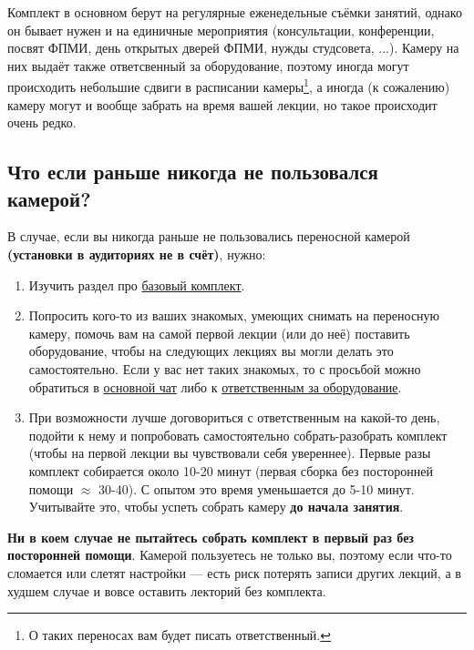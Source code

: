 Комплект в основном берут на регулярные еженедельные съёмки занятий, однако он бывает нужен и на единичные мероприятия (консультации, конференции, посвят ФПМИ, день открытых дверей ФПМИ, нужды студсовета, ...). Камеру на них выдаёт также ответсвенный за оборудование, поэтому иногда могут происходить небольшие сдвиги в расписании камеры\footnote{О таких переносах вам будет писать ответственный.}, а иногда (к сожалению) камеру могут и вообще забрать на время вашей лекции, но такое происходит очень редко.

\subsection{Что если раньше никогда не пользовался камерой?}

В случае, если вы никогда раньше не пользовались переносной камерой \textbf{(установки в аудиториях не в счёт)}, нужно:
\begin{enumerate}
  \item Изучить раздел про \hyperref[ssec:basic-set]{базовый комплект}.

  \item Попросить кого-то из ваших знакомых, умеющих снимать на переносную камеру, помочь вам на самой первой лекции (или до неё) поставить оборудование, чтобы на следующих лекциях вы могли делать это самостоятельно. Если у вас нет таких знакомых, то с просьбой можно обратиться в \hyperlink{main-chat-tg}{основной чат} либо к \hyperlink{responsible-for-equipment}{ответственным за оборудование}.

  \item При возможности лучше договориться с ответственным на какой-то день, подойти к нему и попробовать самостоятельно собрать-разобрать комплект (чтобы на первой лекции вы чувствовали себя увереннее). Первые разы комплект собирается около 10-20 минут (первая сборка без посторонней помощи $\approx$ 30-40). С опытом это время уменьшается до 5-10 минут. Учитывайте это, чтобы успеть собрать камеру \textbf{до начала занятия}.
\end{enumerate}

\textbf{Ни в коем случае не пытайтесь собрать комплект в первый раз без посторонней помощи}. Камерой пользуетесь не только вы, поэтому если что-то сломается или слетят настройки --- есть риск потерять записи других лекций, а в худшем случае и вовсе оставить лекторий без комплекта.




